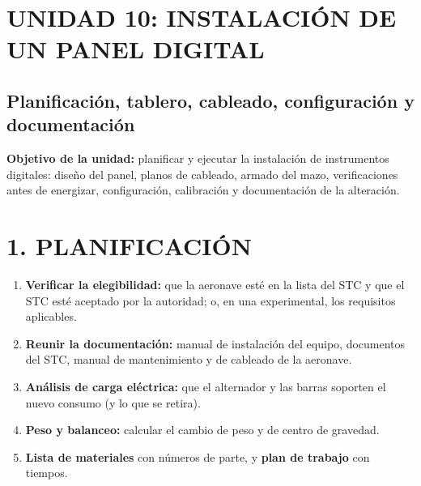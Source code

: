 \clearpage
\section*{UNIDAD 10: INSTALACIÓN DE UN PANEL DIGITAL}
\subsection*{Planificación, tablero, cableado, configuración y documentación}

\begin{recuadro}
\textbf{Objetivo de la unidad:} planificar y ejecutar la instalación de instrumentos digitales:
diseño del panel, planos de cableado, armado del mazo, verificaciones antes de energizar,
configuración, calibración y documentación de la alteración.
\end{recuadro}

\section*{1. PLANIFICACIÓN}
\begin{enumerate}
  \item \textbf{Verificar la elegibilidad:} que la aeronave esté en la lista del STC y que el STC
        esté aceptado por la autoridad; o, en una experimental, los requisitos aplicables.
  \item \textbf{Reunir la documentación:} manual de instalación del equipo, documentos del STC,
        manual de mantenimiento y de cableado de la aeronave.
  \item \textbf{Análisis de carga eléctrica:} que el alternador y las barras soporten el nuevo
        consumo (y lo que se retira).
  \item \textbf{Peso y balanceo:} calcular el cambio de peso y de centro de gravedad.
  \item \textbf{Lista de materiales} con números de parte, y \textbf{plan de trabajo} con tiempos.
\end{enumerate}

